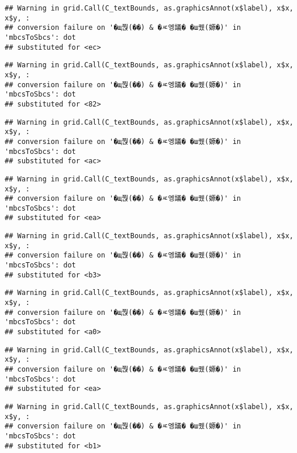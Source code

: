 \documentclass[
]{article}
\begin{document}
\begin{verbatim}
## Warning in grid.Call(C_textBounds, as.graphicsAnnot(x$label), x$x, x$y, :
## conversion failure on '�щ쭩(��) & �ㅼ엥議� �ш퀬(嫄�)' in 'mbcsToSbcs': dot
## substituted for <ec>
\end{verbatim}

\begin{verbatim}
## Warning in grid.Call(C_textBounds, as.graphicsAnnot(x$label), x$x, x$y, :
## conversion failure on '�щ쭩(��) & �ㅼ엥議� �ш퀬(嫄�)' in 'mbcsToSbcs': dot
## substituted for <82>
\end{verbatim}

\begin{verbatim}
## Warning in grid.Call(C_textBounds, as.graphicsAnnot(x$label), x$x, x$y, :
## conversion failure on '�щ쭩(��) & �ㅼ엥議� �ш퀬(嫄�)' in 'mbcsToSbcs': dot
## substituted for <ac>
\end{verbatim}

\begin{verbatim}
## Warning in grid.Call(C_textBounds, as.graphicsAnnot(x$label), x$x, x$y, :
## conversion failure on '�щ쭩(��) & �ㅼ엥議� �ш퀬(嫄�)' in 'mbcsToSbcs': dot
## substituted for <ea>
\end{verbatim}

\begin{verbatim}
## Warning in grid.Call(C_textBounds, as.graphicsAnnot(x$label), x$x, x$y, :
## conversion failure on '�щ쭩(��) & �ㅼ엥議� �ш퀬(嫄�)' in 'mbcsToSbcs': dot
## substituted for <b3>
\end{verbatim}

\begin{verbatim}
## Warning in grid.Call(C_textBounds, as.graphicsAnnot(x$label), x$x, x$y, :
## conversion failure on '�щ쭩(��) & �ㅼ엥議� �ш퀬(嫄�)' in 'mbcsToSbcs': dot
## substituted for <a0>
\end{verbatim}

\begin{verbatim}
## Warning in grid.Call(C_textBounds, as.graphicsAnnot(x$label), x$x, x$y, :
## conversion failure on '�щ쭩(��) & �ㅼ엥議� �ш퀬(嫄�)' in 'mbcsToSbcs': dot
## substituted for <ea>
\end{verbatim}

\begin{verbatim}
## Warning in grid.Call(C_textBounds, as.graphicsAnnot(x$label), x$x, x$y, :
## conversion failure on '�щ쭩(��) & �ㅼ엥議� �ш퀬(嫄�)' in 'mbcsToSbcs': dot
## substituted for <b1>
\end{verbatim}
\end{document}
